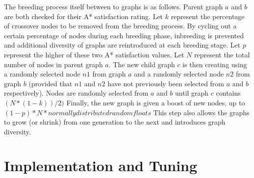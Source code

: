 	The breeding process itself between to graphs is as follows. Parent graph \(a\) and \(b\) are both checked for their A* satisfaction rating. Let \(k\) represent the percentage of crossover nodes to be removed from the breeding process. By cycling out a certain percentage of nodes during each breeding phase, inbreeding is prevented and additional diversity of graphs are reintroduced at each breeding stage. Let \(p\) represent the higher of these two A* satisfaction values. Let \(N\) represent the total number of nodes in parent graph \(a\). The new child graph \(c\) is then creating using a randomly selected node \(n1\) from graph \(a\) and a randomly selected node \(n2\) from graph \(b\) (provided that \(n1\) and \(n2\) have not previously been selected from \(a\) and \(b\) respectively). Nodes are randomly selected from \(a\) and \(b\) until graph \(c\) contains \((N*(1-k))/2)\) Finally, the new graph is given a boost of new nodes, up to \((1-p)*N * normally distributed random floats\) This step also allows the graphs to grow (or shrink) from one generation to the next and introduces graph diversity.

\section{Implementation and Tuning}